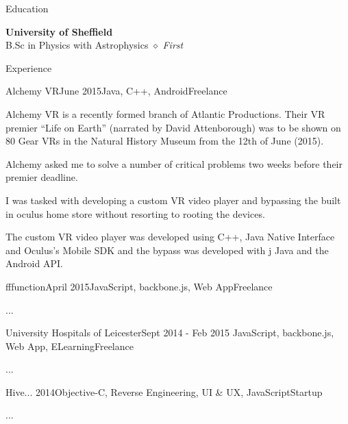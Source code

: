 \documentclass{resume} %
\begin{document}

\begin{rSection}{Education}

{\bf University of Sheffield} 
\\
B.Sc in Physics with Astrophysics $\diamond{}$ \textit{First}
\end{rSection}


\begin{rSection}{Experience}

\begin{rSubsection}{Alchemy VR}{June 2015}{Java, C++, Android}{Freelance}
\item Alchemy VR is a recently formed branch of Atlantic Productions. Their VR premier ``Life on Earth'' (narrated by David Attenborough) was to be shown on 80 Gear VRs in the Natural History Museum from the 12th of June (2015).
\item Alchemy asked me to solve a number of critical problems two weeks before their premier deadline.
\item I was tasked with developing a custom VR video player and bypassing the built in oculus home store without resorting to rooting the devices.
\item The custom VR video player was developed using C++, Java Native Interface and Oculus's Mobile SDK and the bypass was developed with j
Java and the Android API.
\end{rSubsection}


\begin{rSubsection}{fffunction}{April 2015}{JavaScript, backbone.js, Web App}{Freelance}
\item ...
\end{rSubsection}


\begin{rSubsection}{University Hospitals of Leicester}{Sept 2014 - Feb 2015}{ JavaScript, backbone.js, Web App, ELearning}{Freelance}
\item ...
\end{rSubsection}


\begin{rSubsection}{Hive}{... 2014}{Objective-C, Reverse Engineering,  UI \& UX, JavaScript}{Startup}
\item ...
\end{rSubsection}


\end{rSection}
\end{document}
